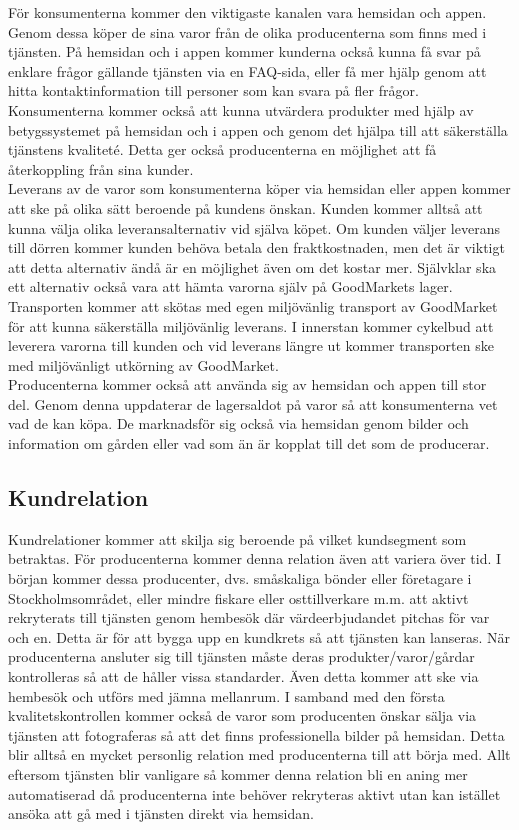 \documentclass[10pt,a4paper,oneside]{article}
\begin{document}
För konsumenterna kommer den viktigaste kanalen vara hemsidan och appen. Genom dessa köper de sina varor från de olika producenterna som finns med i tjänsten. På hemsidan och i appen kommer kunderna också kunna få svar på enklare frågor gällande tjänsten via en FAQ-sida, eller få mer hjälp genom att hitta kontaktinformation till personer som kan svara på fler frågor. Konsumenterna kommer också att kunna utvärdera produkter med hjälp av betygssystemet på hemsidan och i appen och genom det hjälpa till att säkerställa tjänstens kvaliteté. Detta ger också producenterna en möjlighet att få återkoppling från sina kunder. \\ 

Leverans av de varor som konsumenterna köper via  hemsidan eller appen kommer att ske på olika sätt beroende på kundens önskan. Kunden kommer alltså att kunna välja olika leveransalternativ vid själva köpet. Om kunden väljer leverans till dörren kommer kunden behöva betala den fraktkostnaden, men det är viktigt att detta alternativ ändå är en möjlighet även om det kostar mer. Självklar ska ett alternativ också vara att hämta varorna själv på GoodMarkets lager. Transporten kommer att skötas med egen miljövänlig transport av GoodMarket för att kunna säkerställa miljövänlig leverans. I innerstan kommer cykelbud att leverera varorna till kunden och vid leverans längre ut kommer transporten ske med miljövänligt utkörning av GoodMarket.\\

Producenterna kommer också att använda sig av hemsidan och appen till stor del. Genom denna uppdaterar de lagersaldot på varor så att konsumenterna vet vad de kan köpa. De marknadsför sig också via hemsidan genom bilder och information om gården eller vad som än är kopplat till det som de producerar. 


\subsection{Kundrelation}
Kundrelationer kommer att skilja sig beroende på vilket kundsegment som betraktas. För producenterna kommer denna relation även att variera över tid. I början kommer dessa producenter, dvs. småskaliga bönder eller företagare i Stockholmsområdet, eller mindre fiskare eller osttillverkare m.m. att aktivt rekryterats till tjänsten genom hembesök där värdeerbjudandet pitchas för var och en. Detta är för att bygga upp en kundkrets så att tjänsten kan lanseras. När producenterna ansluter sig till tjänsten måste deras produkter/varor/gårdar kontrolleras så att de håller vissa standarder. Även detta kommer att ske via hembesök och utförs med jämna mellanrum. I samband med den första kvalitetskontrollen kommer också de varor som producenten önskar sälja via tjänsten att fotograferas så att det finns professionella bilder på hemsidan. Detta blir alltså en mycket personlig relation med producenterna till att börja med. Allt eftersom tjänsten blir vanligare så kommer denna relation bli en aning mer automatiserad då producenterna inte behöver rekryteras aktivt utan kan istället ansöka att gå med i tjänsten direkt via hemsidan. \\
\end{document}
